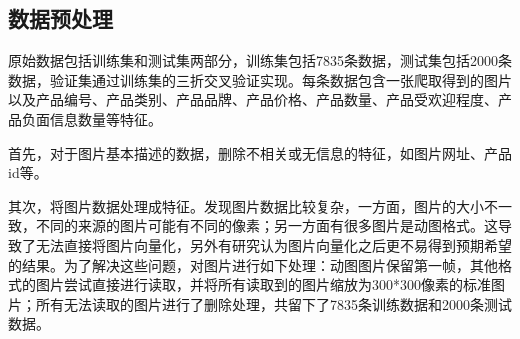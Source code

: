 \documentclass{article}
\begin{document}
\subsection{数据预处理}
\par 原始数据包括训练集和测试集两部分，训练集包括7835条数据，测试集包括2000条数据，验证集通过训练集的三折交叉验证实现。每条数据包含一张爬取得到的图片以及产品编号、产品类别、产品品牌、产品价格、产品数量、产品受欢迎程度、产品负面信息数量等特征。
\par 首先，对于图片基本描述的数据，删除不相关或无信息的特征，如图片网址、产品id等。
\par 其次，将图片数据处理成特征。发现图片数据比较复杂，一方面，图片的大小不一致，不同的来源的图片可能有不同的像素；另一方面有很多图片是动图格式。这导致了无法直接将图片向量化，另外有研究认为图片向量化之后更不易得到预期希望的结果。为了解决这些问题，对图片进行如下处理：动图图片保留第一帧，其他格式的图片尝试直接进行读取，并将所有读取到的图片缩放为300*300像素的标准图片；所有无法读取的图片进行了删除处理，共留下了7835条训练数据和2000条测试数据。
\end{document}

